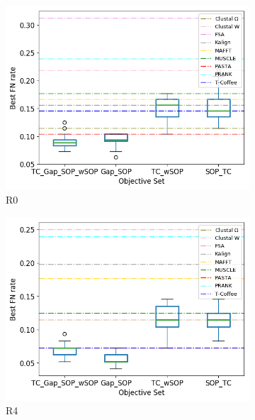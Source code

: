 \begin{figure}[!htbp]
	\centering
	\begin{adjustwidth}{-1cm}{-1cm}
		\begin{subfigure}{0.22\textwidth}
			\includegraphics[width=\columnwidth]{Figure/summary/precomputedInit/R0/objset_fnrate_rank}
			\caption{R0}
		\end{subfigure}	
		\begin{subfigure}{0.22\textwidth}
			\includegraphics[width=\columnwidth]{Figure/summary/precomputedInit/R4/objset_fnrate_rank}
			\caption{R4}
		\end{subfigure}
		\begin{subfigure}{0.22\textwidth}

\end{subfigure}
\end{adjustwidth}
\end{figure}
